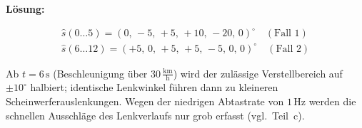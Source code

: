 \begin{beispiel}
\textbf{Lösung:}

$$
\boxed{\;
\begin{array}{l}
\hat{s}(0\ldots5) = (0,\, -5,\, +5,\, +10,\, -20,\, 0)^\circ \quad (\text{Fall 1}) \\[4pt]
\hat{s}(6\ldots12) = (+5,\, 0,\, +5,\, +5,\, -5,\, 0,\, 0)^\circ \quad (\text{Fall 2})
\end{array}\;}
$$

Ab $t = 6\,\text{s}$ (Beschleunigung über $30\,\tfrac{\text{km}}{\text{h}}$) wird
der zulässige Verstellbereich auf $\pm 10^\circ$ halbiert; identische
Lenkwinkel führen dann zu kleineren Scheinwerferauslenkungen. Wegen der niedrigen
Abtastrate von $1\,\text{Hz}$ werden die schnellen Ausschläge des Lenkverlaufs nur
grob erfasst (vgl.\ Teil~c).

\end{beispiel}
